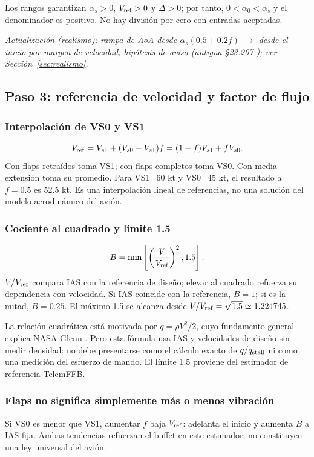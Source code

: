 Los rangos garantizan $\alpha_s>0$, $V_{\rm ref}>0$ y $\Delta>0$; por tanto, $0<\alpha_0<\alpha_s$ y el denominador es positivo. No hay división por cero con entradas aceptadas.

\textit{Actualización (realismo): rampa de AoA desde $\alpha_s(0.5+0.2f)$ $\rightarrow$ desde el inicio por margen de velocidad; hipótesis de aviso (antigua §23.207 \cite{cfr23}); ver Sección~\ref{sec:realismo}.}

\subsection{Paso 3: referencia de velocidad y factor de flujo}
\subsubsection{Interpolación de VS0 y VS1}
\begin{equation}
V_{\rm ref}=V_{s1}+(V_{s0}-V_{s1})f
=(1-f)V_{s1}+fV_{s0}.
\label{eq:stall-vref}
\end{equation}
Con flaps retraídos toma VS1; con flaps completos toma VS0. Con media extensión toma su promedio. Para VS1=60 kt y VS0=45 kt, el resultado a $f=0.5$ es 52.5 kt. Es una interpolación lineal de referencias, no una solución del modelo aerodinámico del avión.

\subsubsection{Cociente al cuadrado y límite 1.5}
\begin{equation}
B=\min\left[\left(\frac{V}{V_{\rm ref}}\right)^2,1.5\right].
\label{eq:stall-flow}
\end{equation}
$V/V_{\rm ref}$ compara IAS con la referencia de diseño; elevar al cuadrado refuerza su dependencia con velocidad. Si IAS coincide con la referencia, $B=1$; si es la mitad, $B=0.25$. El máximo 1.5 se alcanza desde $V/V_{\rm ref}=\sqrt{1.5}\simeq1.224745$.

La relación cuadrática está motivada por $q=\rho V^2/2$, cuyo fundamento general explica NASA Glenn \cite{nasaq}. Pero esta fórmula usa IAS y velocidades de diseño sin medir densidad: no debe presentarse como el cálculo exacto de $q/q_{\rm stall}$ ni como una medición del esfuerzo de mando. El límite 1.5 proviene del estimador de referencia TelemFFB.

\subsubsection{Flaps no significa simplemente más o menos vibración}
Si VS0 es menor que VS1, aumentar $f$ baja $V_{\rm ref}$: adelanta el inicio y aumenta $B$ a IAS fija. Ambas tendencias refuerzan el buffet en este estimador; no constituyen una ley universal del avión.

